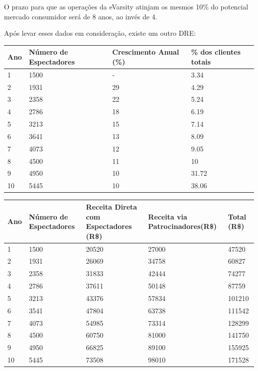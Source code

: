 \documentclass[a4paper, 12pt]{paper}
\begin{document}
O prazo para que as operações da eVarsity atinjam os mesmos 10\% do potencial mercado consumidor será de 8 anos, ao invés de 4.

Após levar esses dados em consideração, existe um outro DRE:

\begin{table}[ht]
	\centering
	\begin{tabular}{p{1cm}p{4.5cm}p{4.2cm}p{4cm}}
		\hline
		\cellcolor{gray}Ano&\cellcolor{gray}Número de Espectadores&\cellcolor{gray}Crescimento Anual (\%)&\cellcolor{gray}\% dos clientes totais\\
		\hline
	1 & 1500 & - & 3.34 \\
	2 & 1931 & 29 & 4.29 \\
	3 & 2358 & 22 & 5.24\\
	4 & 2786 & 18 & 6.19 \\
	5 & 3213 & 15 & 7.14 \\
	6 & 3641 & 13 & 8.09 \\
	7 & 4073 & 12 & 9.05 \\
	8 & 4500 & 11 & 10 \\
	9 & 4950 & 10 & 31.72 \\
	10 & 5445 & 10 & 38.06 \\ \hline
		\end{tabular}
	\end{table}

\begin{table}[ht]
	\centering
	\begin{tabular}{p{1cm}p{3cm}p{3.5cm}p{3.5cm}p{3cm}}
		\hline
		\cellcolor{gray}Ano&\cellcolor{gray}Número de Espectadores&\cellcolor{gray}Receita Direta com Espectadores (R\$)&\cellcolor{gray}Receita via Patrocinadores(R\$)&\cellcolor{gray}Total (R\$)\\
		\hline
	1 & 1500 & 20520 & 27000 & 47520 \\
	2 & 1931 & 26069 & 34758 & 60827 \\
	3 & 2358 & 31833 & 42444 & 74277 \\
	4 & 2786 & 37611 & 50148 & 87759 \\
	5 & 3213 & 43376 & 57834 & 101210 \\
	6 & 3541 & 47804 & 63738 & 111542 \\
	7 & 4073 & 54985 & 73314 & 128299 \\
	8 & 4500 & 60750 & 81000 & 141750 \\
	9 & 4950 & 66825 & 89100 & 155925 \\
	10 & 5445 & 73508 & 98010 & 171528 \\ \hline
		\end{tabular}
	\end{table}
\end{document}
